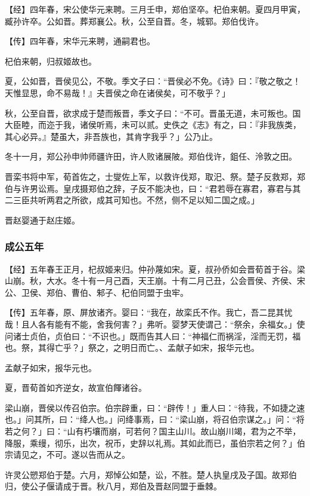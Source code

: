 \documentclass[]{article}
\begin{document}
【经】四年春，宋公使华元来聘。三月壬申，郑伯坚卒。杞伯来朝。夏四月甲寅，臧孙许卒。公如晋。葬郑襄公。秋，公至自晋。冬，城郓。郑伯伐许。

【传】四年春，宋华元来聘，通嗣君也。

杞伯来朝，归叔姬故也。

夏，公如晋，晋侯见公，不敬。季文子曰：``晋侯必不免。《诗》曰：『敬之敬之！天惟显思，命不易哉！』夫晋侯之命在诸侯矣，可不敬乎？」

秋，公至自晋，欲求成于楚而叛晋，季文子曰：``不可。晋虽无道，未可叛也。国大臣睦，而迩于我，诸侯听焉，未可以贰。史佚之《志》有之，曰：『非我族类，其心必异。』楚虽大，非吾族也，其肯字我乎？」公乃止。

冬十一月，郑公孙申帅师疆许田，许人败诸展陂。郑伯伐许，鉏任、泠敦之田。

晋栾书将中军，荀首佐之，士燮佐上军，以救许伐郑，取汜、祭。楚子反救郑，郑伯与许男讼焉。皇戌摄郑伯之辞，子反不能决也，曰：``君若辱在寡君，寡君与其二三臣共听两君之所欲，成其可知也。不然，侧不足以知二国之成。」

晋赵婴通于赵庄姬。

\hypertarget{header-n1584}{%
\subsubsection{成公五年}\label{header-n1584}}

【经】五年春王正月，杞叔姬来归。仲孙蔑如宋。夏，叔孙侨如会晋荀首于谷。梁山崩。秋，大水。冬十有一月己酉，天王崩。十有二月己丑，公会晋侯、齐侯、宋公、卫侯、郑伯、曹伯、邾子、杞伯同盟于虫牢。

【传】五年春，原、屏放诸齐。婴曰：``我在，故栾氏不作。我亡，吾二昆其忧哉！且人各有能有不能，舍我何害？」弗听。婴梦天使谓己：``祭余，余福女。」使问诸士贞伯，贞伯曰：``不识也。」既而告其人曰：``神福仁而祸淫，淫而无罚，福也。祭，其得亡乎？」祭之，之明日而亡。、孟献子如宋，报华元也。

孟献子如宋，报华元也。

夏，晋荀首如齐逆女，故宣伯餫诸谷。

梁山崩，晋侯以传召伯宗。伯宗辟重，曰：``辟传！」重人曰：``待我，不如捷之速也。」问其所，曰：``绛人也。」问绛事焉，曰：``梁山崩，将召伯宗谋之。」问：``将若之何？」曰：``山有朽壤而崩，可若何？国主山川。故山崩川竭，君为之不举，降服，乘缦，彻乐，出次，祝币，史辞以礼焉。其如此而已，虽伯宗若之何？」伯宗请见之，不可。遂以告而从之。

许灵公愬郑伯于楚。六月，郑悼公如楚，讼，不胜。楚人执皇戌及子国。故郑伯归，使公子偃请成于晋。秋八月，郑伯及晋赵同盟于垂棘。
\end{document}

